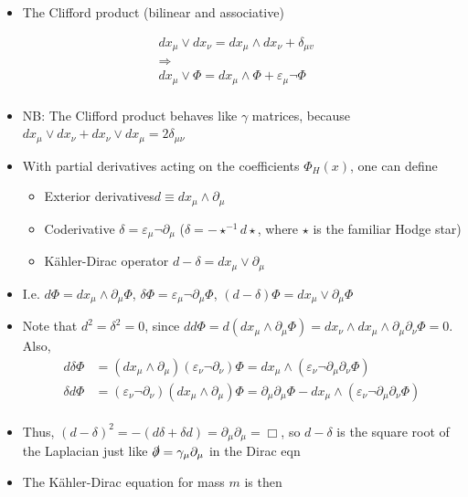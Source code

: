 \begin{itemize}
  \item The Clifford product (bilinear and associative)
\end{itemize}

\begin{equation}
\begin{aligned}
& d x_{\mu} \vee d x_{\nu}=d x_{\mu} \wedge d x_{\nu}+\delta_{\mu v} \\
& \Rightarrow \\
& d x_{\mu} \vee \Phi=d x_{\mu} \wedge \Phi+\varepsilon_{\mu} \neg \Phi \\
\end{aligned}
\end{equation}
\begin{itemize}
    \item NB: The Clifford product behaves like $\gamma$ matrices, because $d x_\mu \vee d x_\nu + d x_\nu \vee d x _\mu = 2 \delta_{\mu \nu}$
    \item With partial derivatives acting on the coefficients $\Phi_H(x)$, one can define
    \begin{itemize}
        \item Exterior derivatives$d \equiv dx_\mu \wedge \partial_\mu$
        \item Coderivative $\delta = \varepsilon_\mu \neg \partial_\mu$ ($\delta = - \star^{-1}d\star$, where $\star$ is the familiar Hodge star)
        \item K\"ahler-Dirac operator $d-\delta = dx_\mu \vee \partial_\mu$
    \end{itemize}
    \item I.e. $d\Phi = dx_\mu \wedge \partial_\mu \Phi$, $\delta\Phi =  \varepsilon_\mu \neg \partial_\mu \Phi$, $(d-\delta)\Phi = dx_\mu \vee \partial_\mu \Phi$
    \item Note that $d^2 = \delta^2 = 0$, since $dd\Phi = d(dx_\mu\wedge \partial_\mu\Phi) = dx_\nu \wedge dx_\mu \wedge \partial_\mu \partial_\nu \Phi = 0$.
    Also,
    \begin{equation}
    \begin{aligned}
    d\delta\Phi&=(dx_\mu\wedge\partial_\mu)(\varepsilon_\nu \neg\partial_\nu)\Phi=dx_\mu\wedge(\varepsilon_\nu\neg \partial_\mu\partial_\nu\Phi) \\
    \delta d\Phi&=(\varepsilon_\nu \neg\partial_\nu)(dx_\mu\wedge\partial_\mu)\Phi=\partial_\mu\partial_\mu\Phi - dx_\mu\wedge(\varepsilon_\nu\neg \partial_\mu\partial_\nu\Phi) \\
    \end{aligned}
    \end{equation}
    \item Thus, $(d-\delta)^2 = -(d \delta + \delta d) = \partial_\mu \partial_\mu = \Box$, so $d-\delta$ is the square root of the Laplacian just like $\slashed{\partial} = \gamma_\mu \partial_\mu$ in the Dirac eqn
    \item The K\"ahler-Dirac equation for mass $m$ is then
\end{itemize}
